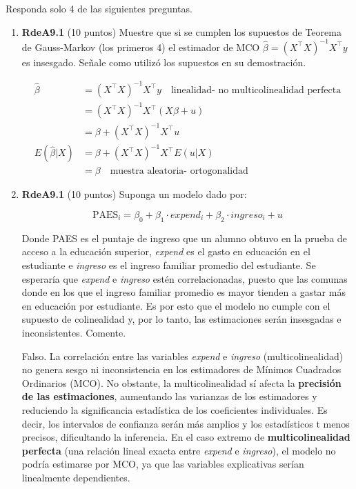 \documentclass[10pt,a4paper]{article}
\begin{document}
Responda solo 4 de las siguientes preguntas.
\begin{enumerate}
    \item \textbf{RdeA9.1} (10 puntos) 
   Muestre que si se cumplen los supuestos de Teorema de Gauss-Markov (los primeros 4) el estimador de MCO $ \hat{\beta} = (X^{\top}X)^{-1}X^{\top}y$
es insesgado. Señale como utilizó los supuestos en su demostración.

{\color{blue} \begin{align*}
        \hat{\beta} &= (X^{\top}X)^{-1}X^{\top}y \quad \text{linealidad- no multicolinealidad perfecta} \\
        &= (X^{\top}X)^{-1}X^{\top}(X\beta + u) \quad \text{} \\
        &= \beta + (X^{\top}X)^{-1}X^{\top}u \quad  \\
        E(\hat{\beta}|X) &= \beta + (X^{\top}X)^{-1}X^{\top}E(u|X) \quad  \\
        &= \beta \quad \text{muestra aleatoria- ortogonalidad}
    \end{align*}}
 \item \textbf{RdeA9.1} (10 puntos)  
Suponga un modelo dado por:

$$\text{PAES}_i = \beta_0 + \beta_1 \cdot expend_i + \beta_2 \cdot ingreso_i + u$$

Donde PAES es el puntaje de ingreso que un alumno obtuvo en la prueba de acceso a la educación superior, \textit{expend} es el gasto en educación en el estudiante e \textit{ingreso} es el ingreso familiar promedio del estudiante. 
Se esperaría que \textit{expend} e \textit{ingreso} estén correlacionadas, puesto que las comunas donde en los que el ingreso familiar promedio es mayor tienden a gastar más en educación por estudiante. Es por esto que el modelo no cumple con el supuesto de colinealidad y, por lo tanto, las estimaciones serán insesgadas e inconsistentes. Comente.

 
{\color{blue}
Falso. La correlación entre las variables \textit{expend} e \textit{ingreso} (multicolinealidad)  no genera sesgo ni inconsistencia en los estimadores de Mínimos Cuadrados Ordinarios (MCO).
No obstante, la multicolinealidad  sí afecta la \textbf{precisión de las estimaciones}, aumentando las varianzas de los estimadores y reduciendo la significancia estadística de los coeficientes individuales. Es decir, los intervalos de confianza serán más amplios y los estadísticos t menos precisos, dificultando la inferencia.
En el caso extremo de \textbf{multicolinealidad perfecta} (una relación lineal exacta entre \textit{expend} e \textit{ingreso}), el modelo no podría estimarse por MCO, ya que las variables explicativas serían linealmente dependientes.
}



\end{enumerate}
\end{document}

